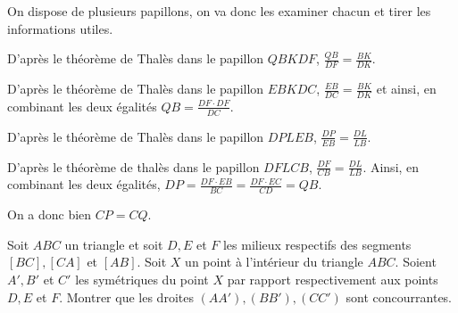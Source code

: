 \begin{sol}
\begin{center}
\end{center}

On dispose de plusieurs papillons, on va donc les examiner chacun et tirer les informations utiles. 

D'après le théorème de Thalès dans le papillon $QBKDF$, $\frac{QB}{DF}=\frac{BK}{DK}$. 

D'après le théorème de Thalès dans le papillon $EBKDC$, $\frac{EB}{DC}=\frac{BK}{DK}$ et ainsi, en combinant les deux égalités $QB=\frac{DF \cdot DF}{DC}$. 

D'après le théorème de Thalès dans le papillon $DPLEB$, $\frac{DP}{EB}=\frac{DL}{LB}$. 

D'après le théorème de thalès dans le papillon $DFLCB$, $\frac{DF}{CB}=\frac{DL}{LB}$. Ainsi, en combinant les deux égalités, $DP=\frac{DF\cdot EB}{BC}=\frac{DF\cdot EC}{CD}=QB$. 

On a donc bien $CP=CQ$.  

\end{sol}

\begin{exo}
Soit $ABC$ un triangle et soit $D,E$ et $F$ les milieux respectifs des segments $[BC], [CA]$ et $[AB]$. Soit $X$ un point à l'intérieur du triangle $ABC$. Soient $A',B'$ et $C'$ les symétriques du point $X$ par rapport respectivement aux points $D,E$ et $F$. Montrer que les droites $(AA'),(BB'),(CC')$ sont concourrantes. 
\end{exo}

